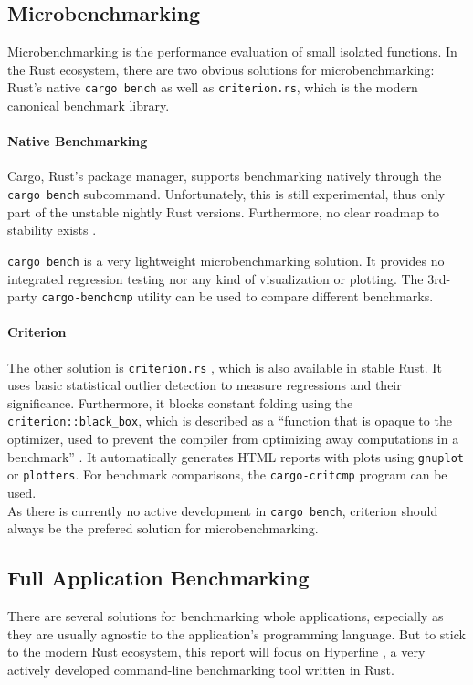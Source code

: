 \subsection{Microbenchmarking}
Microbenchmarking is the performance evaluation of small isolated functions. In the Rust ecosystem, there are two obvious solutions for microbenchmarking: Rust's native \texttt{cargo bench} as well as \texttt{criterion.rs}, which is the modern canonical benchmark library.

\paragraph{Native Benchmarking} Cargo, Rust's package manager, supports benchmarking natively through the \texttt{cargo bench} \cite{cargobench} subcommand. Unfortunately, this is still experimental, thus only part of the unstable nightly Rust versions. Furthermore, no clear roadmap to stability exists \cite{benchstable}.

\texttt{cargo bench} is a very lightweight microbenchmarking solution. It provides no integrated regression testing nor any kind of visualization or plotting. The 3rd-party \texttt{cargo-benchcmp} \cite{benchcmp} utility can be used to compare different benchmarks.

\paragraph{Criterion} The other solution is \texttt{criterion.rs} \cite{criterion}, which is also available in stable Rust. It uses basic statistical outlier detection to measure regressions and their significance. Furthermore, it blocks constant folding using the \texttt{criterion::black\_box}, which is described as a ``function that is opaque to the optimizer, used to prevent the compiler from optimizing away computations in a benchmark'' \cite{blackbox}. It automatically generates HTML reports with plots using \texttt{gnuplot} or \texttt{plotters}. For benchmark comparisons, the \texttt{cargo-critcmp} \cite{critcmp} program can be used.\\

As there is currently no active development in \texttt{cargo bench}, criterion should always be the prefered solution for microbenchmarking.

\subsection{Full Application Benchmarking}
There are several solutions for benchmarking whole applications, especially as they are usually agnostic to the application's programming language. But to stick to the modern Rust ecosystem, this report will focus on Hyperfine \cite{hyperfine}, a very actively developed command-line benchmarking tool written in Rust.\\

